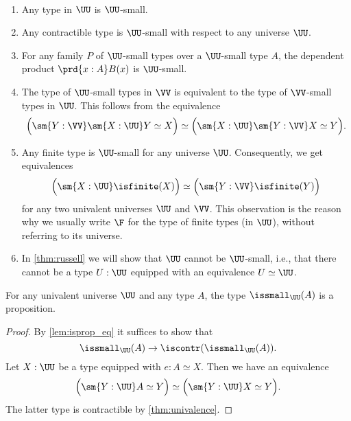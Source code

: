 \begin{eg}
  ~
  \begin{enumerate}
  \item Any type in $\UU$ is $\UU$-small.
  \item Any contractible type is $\UU$-small with respect to any universe $\UU$. 
  \item For any family $P$ of $\UU$-small types over a $\UU$-small type $A$, the dependent product $\prd{x:A}B(x)$ is $\UU$-small.
  \item The type of $\UU$-small types in $\VV$ is equivalent to the type of $\VV$-small types in $\UU$. This follows from the equivalence
    \begin{equation*}
      \Big(\sm{Y:\VV}\sm{X:\UU}Y\simeq X\Big) \simeq \Big(\sm{X:\UU}\sm{Y:\VV}X\simeq Y\Big).
    \end{equation*}
  \item Any finite type is $\UU$-small for any universe $\UU$. Consequently, we get equivalences
  \begin{equation*}
    \Big(\sm{X:\UU}\isfinite(X)\Big)\simeq\Big(\sm{Y:\VV}\isfinite(Y)\Big)
  \end{equation*}
  for any two univalent universes $\UU$ and $\VV$. This observation is the reason why we usually write $\F$ for the type of finite types (in $\UU$), without referring to its universe.
  \item In \cref{thm:russell} we will show that $\UU$ cannot be $\UU$-small, i.e., that there cannot be a type $U:\UU$ equipped with an equivalence $U\simeq \UU$.
  \end{enumerate}
\end{eg}

\begin{prp}\label{prp:small}
  For any univalent universe $\UU$ and any type $A$, the type $\issmall_\UU(A)$ is a proposition.
\end{prp}

\begin{proof}
  By \cref{lem:isprop_eq} it suffices to show that
  \begin{equation*}
    \issmall_\UU(A)\to\iscontr(\issmall_\UU(A)).
  \end{equation*}
  Let $X:\UU$ be a type equipped with $e:A\simeq X$. Then we have an equivalence
  \begin{equation*}
    \Big(\sm{Y:\UU}A\simeq Y\Big)\simeq\Big(\sm{Y:\UU}X\simeq Y\Big).
  \end{equation*}
  The latter type is contractible by \cref{thm:univalence}.
\end{proof}

